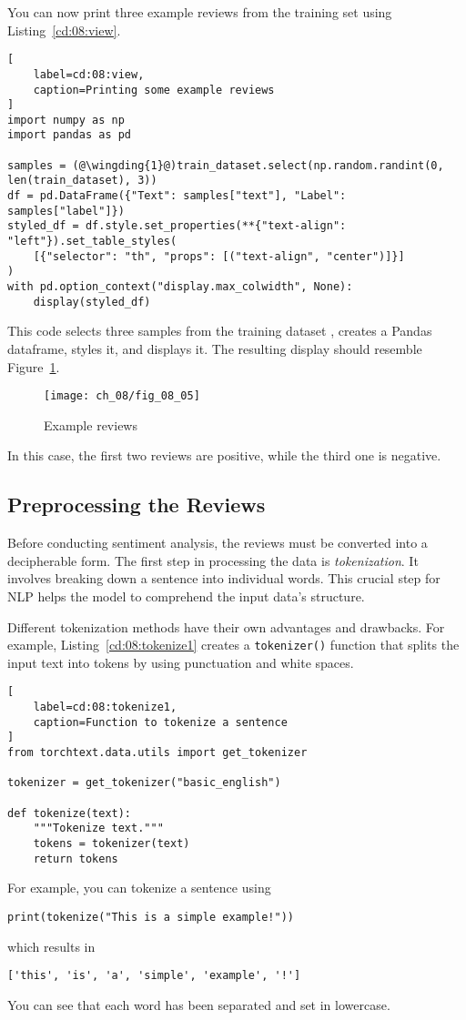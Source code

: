 You can now print three example reviews from the training set using Listing~\ref{cd:08:view}.
\begin{lstlisting}[
    label=cd:08:view,
    caption=Printing some example reviews
]
import numpy as np
import pandas as pd

samples = (@\wingding{1}@)train_dataset.select(np.random.randint(0, len(train_dataset), 3))
df = pd.DataFrame({"Text": samples["text"], "Label": samples["label"]})
styled_df = df.style.set_properties(**{"text-align": "left"}).set_table_styles(
    [{"selector": "th", "props": [("text-align", "center")]}]
)
with pd.option_context("display.max_colwidth", None):
    display(styled_df)
\end{lstlisting}
This code selects three samples from the training dataset , creates a Pandas dataframe, styles it, and displays it.
The resulting display should resemble Figure~\ref{fig:08:reviews}.

\begin{figure}[H]
    \texttt{[image: ch\_08/fig\_08\_05]} %
    \caption{Example reviews}
    \label{fig:08:reviews}
\end{figure}

In this case, the first two reviews are  positive, while the third one is negative.

\subsection{Preprocessing the Reviews}

Before conducting sentiment analysis, the reviews must be converted into a decipherable form.
The first step in processing the data is \emph{tokenization}. It involves breaking down a sentence into individual words. This crucial step for NLP helps the model to comprehend the input data's structure. 

Different tokenization methods have their own advantages and drawbacks. For example, Listing~\ref{cd:08:tokenize1} creates a \lstinline{tokenizer()} function that splits the input text into tokens by using punctuation and white spaces.

\begin{lstlisting}[
    label=cd:08:tokenize1,
    caption=Function to tokenize a sentence
]
from torchtext.data.utils import get_tokenizer

tokenizer = get_tokenizer("basic_english")

def tokenize(text):
    """Tokenize text."""
    tokens = tokenizer(text)
    return tokens
\end{lstlisting}
For example, you can tokenize a sentence using
\begin{lstlisting}
print(tokenize("This is a simple example!"))
\end{lstlisting}
which results in
\begin{lstlisting}
['this', 'is', 'a', 'simple', 'example', '!']
\end{lstlisting}
You can see that each word has been separated and set in lowercase.

